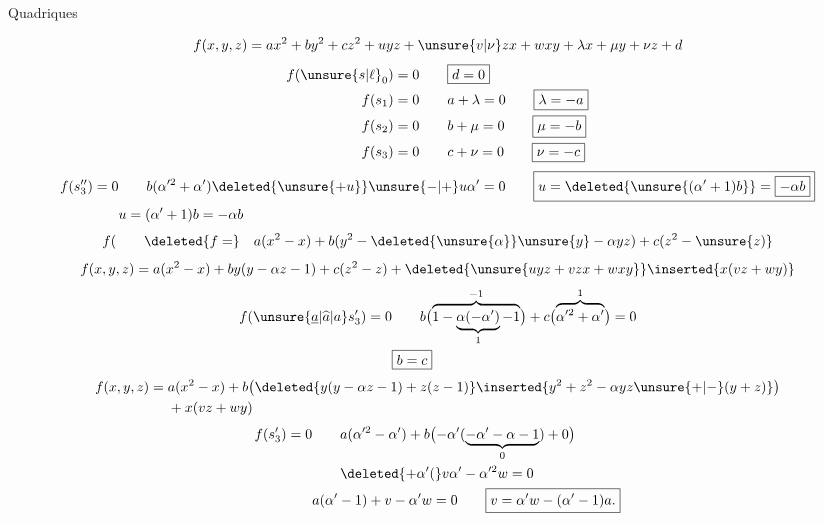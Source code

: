 Quadriques 

\[
f(x,y,z)=ax^2+by^2+cz^2+uyz+\unsure{v|\nu}zx+wxy+\lambda x+\mu y+\nu z+d
\]
\[
\begin{aligned}
f(\unsure{s|\ell}_0)=0&\qquad\boxed{d=0}\\
f(s_1)=0&\qquad a+\lambda=0\qquad\boxed{\lambda=-a}\\
f(s_2)=0&\qquad b+\mu=0\qquad\boxed{\mu=-b}\\
f(s_3)=0&\qquad c+\nu=0\qquad\boxed{\nu=-c}
\end{aligned}
\]
\[
\begin{aligned}
f(s''_3)=0&\qquad b(\alpha^{\prime 2}+\alpha')\deleted{\unsure{+u}}\unsure{-|+}u\alpha'=0
\qquad\boxed{u=\deleted{\unsure{(\alpha'+1)b}}=\boxed{-\alpha b}}\\
&u=(\alpha'+1)b=-\alpha b
\end{aligned}
\]
\[
f(\qquad\deleted{f=}\quad
a(x^2-x)+b(y^2-\deleted{\unsure{\alpha}}\unsure{y}-\alpha yz)+c(z^2-\unsure{z)}
\]
\[
f(x,y,z)=a(x^2-x)+by(y-\alpha z-1)+c(z^2-z)
+\deleted{\unsure{uyz+vzx+wxy}}\inserted{x(vz+wy)}
\]
\[
\begin{aligned}
f(\unsure{\underline a|\widehat a|a}s'_3)=0&\qquad
b\bigl(\overbrace{1-\underbrace{\alpha(-\alpha')}_{1}-1}^{-1}\bigr)
+c\bigl(\overbrace{\alpha^{\prime 2}+\alpha'}^{1}\bigr)=0\\
&\boxed{b=c}
\end{aligned}
\]
\[
\begin{aligned}
f(x,y,z)={}&a(x^2-x)+b\bigl(\deleted{y(y-\alpha z-1)+z(z-1)}\inserted{y^2+z^2-\alpha yz\unsure{+|-}(y+z)}\bigr)\\
&+x(vz+wy)
\end{aligned}
\]
\[
\begin{aligned}
f(s'_3)=0&\qquad a(\alpha^{\prime 2}-\alpha')+b\bigl(-\alpha'(\underbrace{-\alpha'-\alpha-1}_{0})+0\bigr)\\
&\qquad\deleted{+\alpha'(}v\alpha'-\alpha^{\prime 2}w=0\\
&a(\alpha'-1)+v-\alpha'w=0\qquad\boxed{v=\alpha'w-(\alpha'-1)a.}
\end{aligned}
\]
